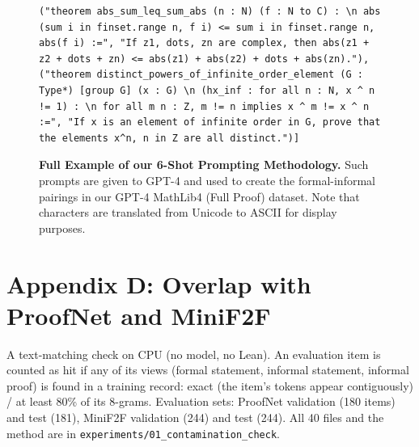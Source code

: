 \documentclass{article} %
\begin{document}
\begin{figure}[htbp]
\begin{mdframed}[linewidth=1pt, roundcorner=10pt, backgroundcolor=gray!10]
\begin{lstlisting}[breaklines=true]
("theorem abs_sum_leq_sum_abs (n : N) (f : N to C) : \n abs (sum i in finset.range n, f i) <= sum i in finset.range n, abs(f i) :=", "If z1, dots, zn are complex, then abs(z1 + z2 + dots + zn) <= abs(z1) + abs(z2) + dots + abs(zn)."), 
("theorem distinct_powers_of_infinite_order_element (G : Type*) [group G] (x : G) \n (hx_inf : for all n : N, x ^ n != 1) : \n for all m n : Z, m != n implies x ^ m != x ^ n :=", "If x is an element of infinite order in G, prove that the elements x^n, n in Z are all distinct.")]
\end{lstlisting}
\end{mdframed}
\caption{\textbf{Full Example of our 6-Shot Prompting Methodology.} Such prompts are given to GPT-4 and used to create the formal-informal pairings in our GPT-4 MathLib4 (Full Proof) dataset. Note that characters are translated from Unicode to ASCII for display purposes.}
\label{fig:verbatim_example}
\end{figure}



\section{Appendix D: Overlap with ProofNet and MiniF2F}
\label{app:contamination}
A text-matching check on CPU (no model, no Lean). An evaluation item is counted as hit if any of its views (formal statement, informal statement, informal proof) is found in a training record: exact (the item's tokens appear contiguously) / at least 80\% of its 8-grams. Evaluation sets: ProofNet validation (180 items) and test (181), MiniF2F validation (244) and test (244). All 40 files and the method are in \texttt{experiments/01\_contamination\_check}.
\end{document}
